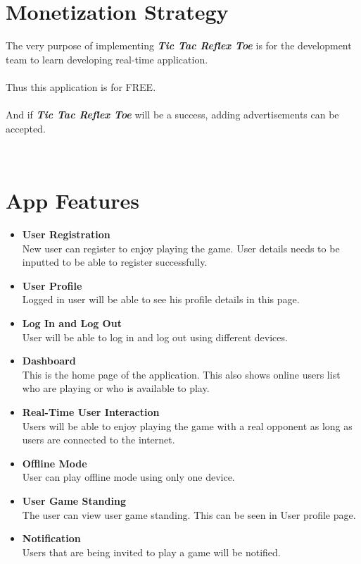 \documentclass{article}
\begin{document}
\section{Monetization Strategy}
The very purpose of implementing \textbf{\emph{Tic Tac Reflex Toe}} is for the development team to learn developing real-time application.\\\\Thus this application is for FREE.\\\\And if \textbf{\emph{Tic Tac Reflex Toe}} will be a success, adding advertisements can be accepted.

~\newline
\section{App Features}
    \begin{itemize}
    	\item \textbf{User Registration}\\
    	New user can register to enjoy playing the game.  User details needs to be inputted to be able to register successfully.
    	\item \textbf{User Profile}\\
    	Logged in user will be able to see his profile details in this page.
    	\item \textbf{Log In and Log Out}\\
    	User will be able to log in and log out using different devices.
    	\item \textbf{Dashboard}\\
    	This is the home page of the application.  This also shows online users list who are playing or who is available to play.
    	\item \textbf{Real-Time User Interaction}\\
    	Users will be able to enjoy playing the game with a real opponent as long as users are connected to the internet.
    	\item \textbf{Offline Mode}\\ 
    	User can play offline mode using only one device.
    	\item \textbf{User Game Standing}\\
    	The user can view user game standing.  This can be seen in User profile page.
    	\item \textbf{Notification}\\
    	Users that are being invited to play a game will be notified.
    \end{itemize}
    ~\newline
\end{document}
